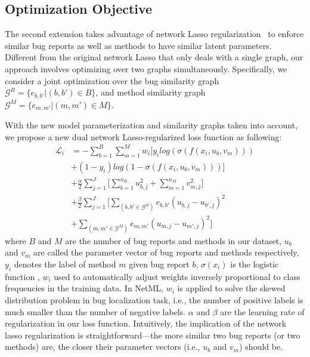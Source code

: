 \subsection{Optimization Objective}
\label{subsec:extension}
The second extension takes advantage of network Lasso regularization~\cite{Hallac:2015:NLC:2783258.2783313} to enforce similar bug reports as well as methods to have similar latent parameters. Different from the original network Lasso that only deals with a single graph, our approach involves optimizing over two graphs simultaneously. Specifically, we consider a joint optimization over the bug
similarity graph $\mathcal{G}^B=\{e_{b,b'}|(b, b') \in B\}$, and method similarity graph $\mathcal{G}^M=\{e_{m,m'}|(m, m') \in M\}$.

With the new model parameterization and similarity graphs taken into account, we propose a new dual network Lasso-regularized loss function as following:
\begin{align}
\label{eq:NL_lossfunc}
	\mathcal{L}_i & = -\sum_{b=1}^{B}\sum_{m=1}^{M} w_i \bigg[y_i log(\sigma(f(x_i, u_b, v_m))) \nonumber\\
	& + (1 - y_i) log(1- \sigma(f(x_i, u_b, v_m))) \bigg] \nonumber\\
	& + \frac{\alpha}{2} \sum_{j=1}^{J} \bigg[\sum_{b=1}^{n_{B}} u_{b,j}^2 + \sum_{m=1}^{n_{M}} v_{m,j}^2 \bigg] \nonumber\\
	& + \frac{\beta}{2} \sum_{j=1}^{J} \bigg[ \sum_{(b, b' \in \mathcal{G}^B)}^{} e_{b, b'} (u_{b,j} - u_{b', j})^2 \nonumber\\ 
	& + \sum_{(m, m' \in \mathcal{G}^M)}^{} e_{m, m'} (u_{m,j} - u_{m', j})^2 \bigg]
\end{align}
where $B$ and $M$ are the number of bug reports and methods in our dataset, $u_b$ and $v_m$ are called the parameter vector of bug reports and methods respectively, $y_i$ denotes the label of method $m$ given bug report $b$, $\sigma(x_i)$ is the logistic function \cite{Collins:2002:LRA:599615.599689}, $w_i$ used to automatically adjust weights inversely proportional to class frequencies in the training data. In NetML, $w_i$ is applied to solve the skewed distribution problem in bug localization task, i.e., the number of positive labels is much smaller than the number of negative labels. $\alpha$ and $\beta$ are the learning rate of regularization in our loss function. Intuitively, the implication of the network lasso regularization is straightforward—the more similar two bug reports (or two methods) are, the closer their parameter vectors (i.e., $u_b$ and $v_m$) should be. 

